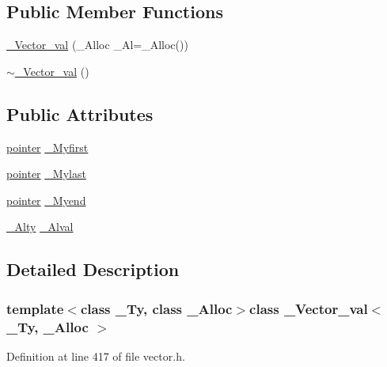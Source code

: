 \subsection*{Public Member Functions}
\begin{DoxyCompactItemize}
\item 
\hyperlink{class___vector__val_a06a11b0429e308118aaa63bda49040f1}{\+\_\+\+Vector\+\_\+val} (\+\_\+\+Alloc \+\_\+\+Al=\+\_\+\+Alloc())
\item 
\hyperlink{class___vector__val_a2e7cc72fb5c7241f0015e7ec4ace117d}{$\sim$\+\_\+\+Vector\+\_\+val} ()
\end{DoxyCompactItemize}
\subsection*{Public Attributes}
\begin{DoxyCompactItemize}
\item 
\hyperlink{class___vector__val_ae6cca5a50b243bc20bd27fa8f620d63e}{pointer} \hyperlink{class___vector__val_ac10d5b268d1c2c005f2b9257e5458ec7}{\+\_\+\+Myfirst}
\item 
\hyperlink{class___vector__val_ae6cca5a50b243bc20bd27fa8f620d63e}{pointer} \hyperlink{class___vector__val_a76c098026a887586c12c91249908ecd9}{\+\_\+\+Mylast}
\item 
\hyperlink{class___vector__val_ae6cca5a50b243bc20bd27fa8f620d63e}{pointer} \hyperlink{class___vector__val_a6ae5d0e49562c6cc6b697450284cda58}{\+\_\+\+Myend}
\item 
\hyperlink{class___vector__val_ad273d1146bf265f65e75133aa2f9986a}{\+\_\+\+Alty} \hyperlink{class___vector__val_a86df8093d4b6a58caa7e8d7ff0c441fd}{\+\_\+\+Alval}
\end{DoxyCompactItemize}


\subsection{Detailed Description}
\subsubsection*{template$<$class \+\_\+\+Ty, class \+\_\+\+Alloc$>$class \+\_\+\+Vector\+\_\+val$<$ \+\_\+\+Ty, \+\_\+\+Alloc $>$}



Definition at line 417 of file vector.\+h.



